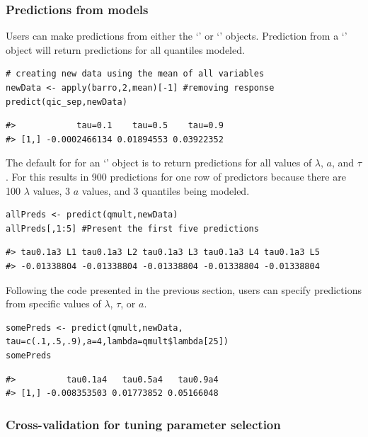 \subsubsection{Predictions from models}\label{predictions-from-models}

Users can make predictions from either the `' or `' objects. Prediction from a `' object will return predictions for all quantiles modeled.

\begin{verbatim}
# creating new data using the mean of all variables
newData <- apply(barro,2,mean)[-1] #removing response
predict(qic_sep,newData)
\end{verbatim}

\begin{verbatim}
#>            tau=0.1    tau=0.5    tau=0.9
#> [1,] -0.0002466134 0.01894553 0.03922352
\end{verbatim}

The default for  for an `' object is to return predictions for all values of \(\lambda\), \(a\), and \(\tau\). For  this results in 900 predictions for one row of predictors because there are 100 \(\lambda\) values, 3 \(a\) values, and 3 quantiles being modeled.

\begin{verbatim}
allPreds <- predict(qmult,newData)
allPreds[,1:5] #Present the first five predictions
\end{verbatim}

\begin{verbatim}
#> tau0.1a3 L1 tau0.1a3 L2 tau0.1a3 L3 tau0.1a3 L4 tau0.1a3 L5 
#> -0.01338804 -0.01338804 -0.01338804 -0.01338804 -0.01338804
\end{verbatim}

Following the  code presented in the previous section, users can specify predictions from specific values of \(\lambda\), \(\tau\), or \(a\).

\begin{verbatim}
somePreds <- predict(qmult,newData, tau=c(.1,.5,.9),a=4,lambda=qmult$lambda[25])
somePreds
\end{verbatim}

\begin{verbatim}
#>          tau0.1a4   tau0.5a4   tau0.9a4
#> [1,] -0.008353503 0.01773852 0.05166048
\end{verbatim}

\subsubsection{Cross-validation for tuning parameter selection}\label{cross-validation-for-tuning-parameter-selection}


